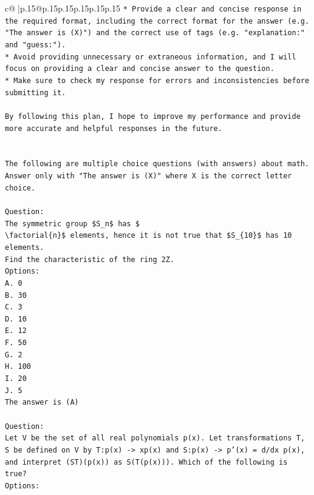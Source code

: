 \documentclass{article}
\begin{document}
{\begin{supertabular}{c@{$\;$}|p{.15\linewidth}@{}p{.15\linewidth}p{.15\linewidth}p{.15\linewidth}p{.15\linewidth}p{.15\linewidth}}
{{{\texttt{* Provide a clear and concise response in the required format, including the correct format for the answer (e.g. "The answer is (X)") and the correct use of tags (e.g. "explanation:" and "guess:").} \\
\texttt{* Avoid providing unnecessary or extraneous information, and I will focus on providing a clear and concise answer to the question.} \\
\texttt{* Make sure to check my response for errors and inconsistencies before submitting it.} \\
\\ 
\texttt{By following this plan, I hope to improve my performance and provide more accurate and helpful responses in the future.} \\
\\ 
\\ 
\texttt{The following are multiple choice questions (with answers) about math. Answer only with "The answer is (X)" where X is the correct letter choice.} \\
\\ 
\texttt{Question:} \\
\texttt{The symmetric group \$S\_n\$ has \$} \\
\texttt{\textbackslash{}factorial\{n\}\$ elements, hence it is not true that \$S\_\{10\}\$ has 10 elements.} \\
\texttt{Find the characteristic of the ring 2Z.} \\
\texttt{Options:} \\
\texttt{A. 0} \\
\texttt{B. 30} \\
\texttt{C. 3} \\
\texttt{D. 10} \\
\texttt{E. 12} \\
\texttt{F. 50} \\
\texttt{G. 2} \\
\texttt{H. 100} \\
\texttt{I. 20} \\
\texttt{J. 5} \\
\texttt{The answer is (A)} \\
\\ 
\texttt{Question:} \\
\texttt{Let V be the set of all real polynomials p(x). Let transformations T, S be defined on V by T:p(x) {-}> xp(x) and S:p(x) {-}> p'(x) = d/dx p(x), and interpret (ST)(p(x)) as S(T(p(x))). Which of the following is true?} \\
\texttt{Options:} \\
}}}
\end{supertabular}}
\end{document}
